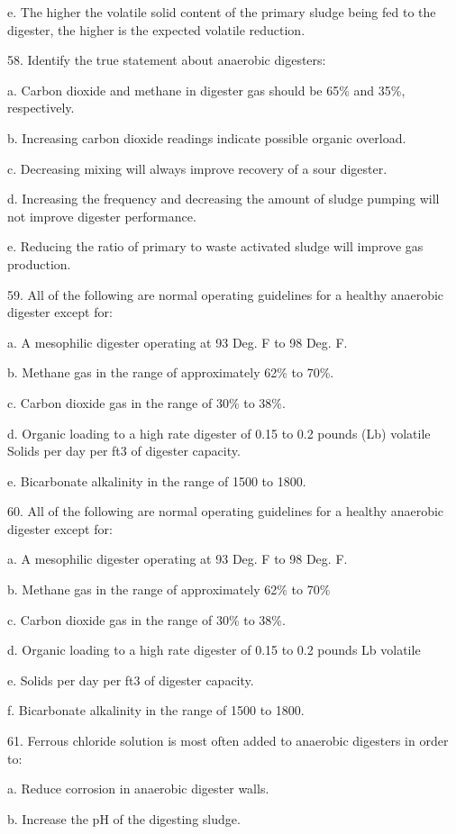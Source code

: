 \documentclass{article}
\begin{document}
e. The higher the volatile solid content of the primary sludge being fed to the digester, the higher is the expected volatile reduction. 


58. Identify the true statement about anaerobic digesters: 

a. Carbon dioxide and methane in digester gas should be 65\% and 35\%, respectively. 

b. Increasing carbon dioxide readings indicate possible organic overload. 

c. Decreasing mixing will always improve recovery of a sour digester. 

d. Increasing the frequency and decreasing the amount of sludge pumping will not improve digester performance. 

e. Reducing the ratio of primary to waste activated sludge will improve gas production. 


59. All of the following are normal operating guidelines for a healthy anaerobic digester except for: 

a. A mesophilic digester operating at 93 Deg. F to 98 Deg. F. 

b. Methane gas in the range of approximately 62\% to 70\%. 

c. Carbon dioxide gas in the range of 30\% to 38\%. 

d. Organic loading to a high rate digester of 0.15 to 0.2 pounds (Lb) volatile Solids per day per ft3 of digester capacity. 

e. Bicarbonate alkalinity in the range of 1500 to 1800. 


60. All of the following are normal operating guidelines for a healthy anaerobic digester except for: 

a. A mesophilic digester operating at 93 Deg. F to 98 Deg. F. 

b. Methane gas in the range of approximately 62\% to 70\% 

c. Carbon dioxide gas in the range of 30\% to 38\%. 

d. Organic loading to a high rate digester of 0.15 to 0.2 pounds Lb volatile 

e. Solids per day per ft3 of digester capacity. 

f. Bicarbonate alkalinity in the range of 1500 to 1800. 


61. Ferrous chloride solution is most often added to anaerobic digesters in order to: 

a. Reduce corrosion in anaerobic digester walls. 

b. Increase the pH of the digesting sludge. 
\end{document}
